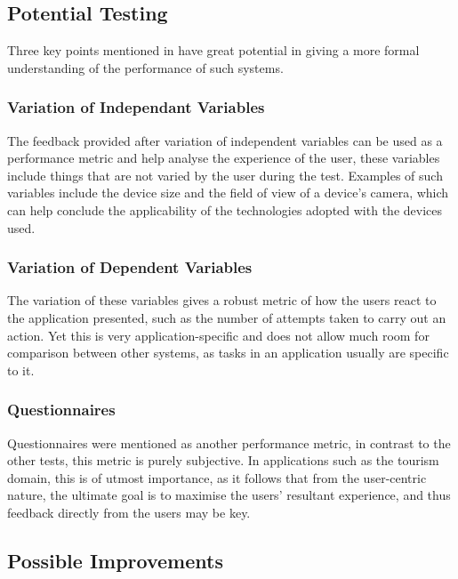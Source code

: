 \subsection{Potential Testing}
Three key points mentioned in \cite{Samini2017} have great potential in giving a more formal understanding of the performance of such systems. 
\subsubsection{Variation of Independant Variables}
The feedback provided after variation of independent variables can be used as a performance metric and help analyse the experience of the user, these variables include things that are not 
varied by the user during the test. Examples of such variables include the device size and the field of view of a device's 
camera, which can help conclude the applicability of the technologies adopted with the devices used.
\subsubsection{Variation of Dependent Variables}
The variation of these variables gives a robust metric of how the users react to the 
application presented, such as the number of attempts taken to carry out an action.
Yet this is very application-specific and does not allow much room for comparison between other systems, as 
tasks in an application usually are specific to it.

\subsubsection{Questionnaires}
Questionnaires were mentioned as another performance metric, in contrast to the other tests, this metric is purely subjective. 
In applications such as the tourism domain, this is of utmost importance, as it follows that 
from the user-centric nature, the ultimate goal is to maximise the users' resultant experience, and thus feedback directly from the users may be key.  

\subsection{Possible Improvements}
